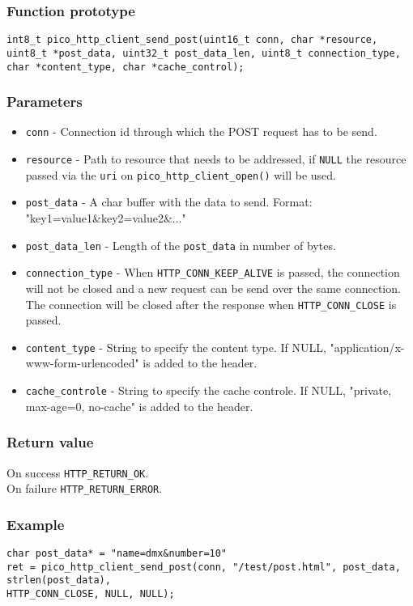 \subsubsection*{Function prototype}
\texttt{int8\_t pico\_http\_client\_send\_post(uint16\_t conn, char *resource, uint8\_t *post\_data, uint32\_t post\_data\_len, uint8\_t connection\_type, char *content\_type, char *cache\_control);}

\subsubsection*{Parameters}
\begin{itemize}[noitemsep]
\item \texttt{conn} - Connection id through which the POST request has to be send.
\item \texttt{resource} - Path to resource that needs to be addressed, if \texttt{NULL} the resource passed via the \texttt{uri} on \texttt{pico\_http\_client\_open()} will be used.
\item \texttt{post\_data} - A char buffer with the data to send. Format: "key1=value1\&key2=value2\&..."
\item \texttt{post\_data\_len} - Length of the \texttt{post\_data} in number of bytes.
\item \texttt{connection\_type} - When \texttt{HTTP\_CONN\_KEEP\_ALIVE} is passed, the connection will not be closed and a new request can be send over the same connection. The connection will be closed after the response when \texttt{HTTP\_CONN\_CLOSE} is passed.
\item \texttt{content\_type} - String to specify the content type. If NULL, "application/x-www-form-urlencoded" is added to the header.
\item \texttt{cache\_controle} - String to specify the cache controle. If NULL, "private, max-age=0, no-cache" is added to the header.
\end{itemize}
\subsubsection*{Return value}
On success \texttt{HTTP\_RETURN\_OK}.
\\On failure \texttt{HTTP\_RETURN\_ERROR}.
\subsubsection*{Example}
\begin{verbatim}
char post_data* = "name=dmx&number=10"
ret = pico_http_client_send_post(conn, "/test/post.html", post_data, strlen(post_data),
HTTP_CONN_CLOSE, NULL, NULL);
\end{verbatim}

